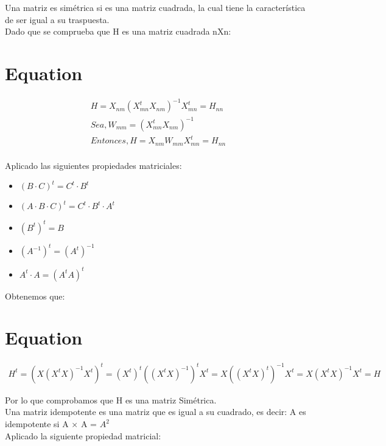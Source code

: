 \documentclass[12pt,spanish]{article}
\begin{document}
	Una matriz es simétrica si es una matriz cuadrada, la cual tiene la característica de ser igual a su traspuesta.\\ 
	
	Dado que se comprueba que H es una matriz cuadrada nXn:
	\section*{Equation}			
	\begin{equation}
	\begin{aligned}
	H =  X_{nm} (X_{mn}^t X_{nm})^{-1}  X_{mn}^t = H_{nn}\\
	Sea,  W_{mm} =  (X_{mn}^t X_{nm})^{-1}\\
	Entonces,  H =  X_{nm} W_{mm}   X_{mn}^t = H_{nn}
	\end{aligned}
	\end{equation}
\\
		 Aplicado las siguientes propiedades matriciales:
	 	\begin{itemize}
	 	\item $(B\cdot C)^t = C^t\cdot  B^t$
	 	\item $(A\cdot B\cdot C)^t=C^t\cdot  B^t\cdot  A^t$
	 	\item $(B^t)^t= B$ 
	    \item $(A^{-1})^t=(A^t)^{-1} $ 
	    \item $ A^t\cdot A=(A^tA)^t$
	 \end{itemize}

    Obtenemos que:\\
    
	\section*{Equation}			
	\begin{equation}
	\begin{aligned}
	H^t =  (X (X^t X)^{-1}  X^t)^t = (X^t)^t ((X^t X)^{-1})^t  X^t = X ((X^t X)^t)^{-1}  X^t = X (X^t X)^{-1}  X^t = H
 	\end{aligned}
	\end{equation}

	Por lo que comprobamos que H es una matriz Simétrica.\\
	

	Una matriz idempotente es una matriz que es igual a su cuadrado, es decir: A es idempotente si A × A =  $A^2$\\
	
		 Aplicado la siguiente propiedad matricial:
\end{document}

